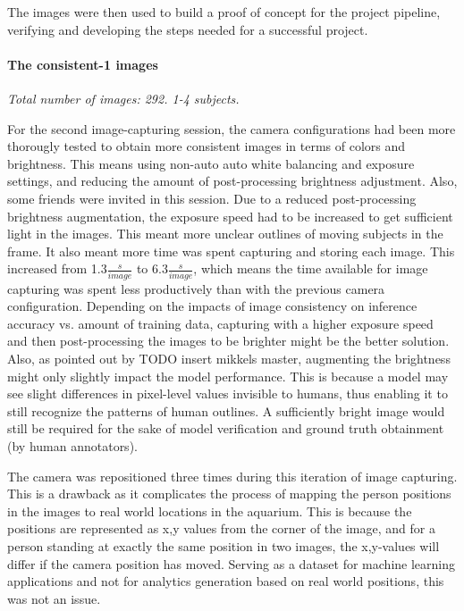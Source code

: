 The images were then used to build a proof of concept for the project pipeline, verifying and developing the steps needed for a successful project.

\paragraph{The consistent-1 images}
\textit{Total number of images: 292. 1-4 subjects.}

For the second image-capturing session, the camera configurations had been more thorougly tested to obtain more consistent images in terms of colors and brightness. This means using non-auto auto white balancing and exposure settings, and reducing the amount of post-processing brightness adjustment. Also, some friends were invited in this session. Due to a reduced post-processing brightness augmentation, the exposure speed had to be increased to get sufficient light in the images. This meant more unclear outlines of moving subjects in the frame. It also meant more time was spent capturing and storing each image. This increased from 1.3$\frac{s}{image}$ to 6.3$\frac{s}{image}$, which means the time available for image capturing was spent less productively than with the previous camera configuration. Depending on the impacts of image consistency on inference accuracy vs. amount of training data, capturing with a higher exposure speed and then post-processing the images to be brighter might be the better solution. Also, as pointed out by TODO insert mikkels master, augmenting the brightness might only slightly impact the model performance. This is because a model may see slight differences in pixel-level values invisible to humans, thus enabling it to still recognize the patterns of human outlines. A sufficiently bright image would still be required for the sake of model verification and ground truth obtainment (by human annotators).

The camera was repositioned three times during this iteration of image capturing. This is a drawback as it complicates the process of mapping the person positions in the images to real world locations in the aquarium. This is because the positions are represented as x,y values from the corner of the image, and for a person standing at exactly the same position in two images, the x,y-values will differ if the camera position has moved. Serving as a dataset for machine learning applications and not for analytics generation based on real world positions, this was not an issue.

